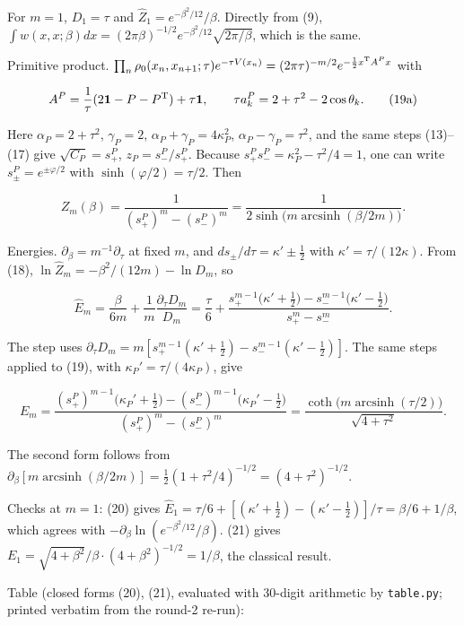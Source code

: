 \documentclass[11pt,a4paper]{article}
\newcommand{\tagmark}[1]{\marginnote{\scriptsize\ttfamily #1}}
\newcommand{\Dtag}{\tagmark{[D]}}   %
\newcommand{\passthrough}[1]{#1}
\begin{document}
For \(m=1\), \(D_1 = \tau\) and \(\hat Z_1 = e^{-\beta^2/12}/\beta\).
Directly from (9),
\(\int w(x,x;\beta)dx = (2\pi\beta)^{-1/2}e^{-\beta^2/12}\sqrt{2\pi/\beta}\),
which is the same.

Primitive product.
\(\prod_n\rho_0(x_n,x_{n+1};\tau)e^{-\tau V(x_n)} = (2\pi\tau)^{-m/2}e^{-\frac12x^{\rm T}A^Px}\)
with

\[
A^P = \frac1\tau(2\mathbf 1 - P - P^{\rm T}) + \tau\mathbf 1,\qquad \tau a^P_k = 2 + \tau^2 - 2\cos\theta_k. \tag{19a}
\]

\Dtag{} Here \(\alpha_P = 2+\tau^2\), \(\gamma_P = 2\),
\(\alpha_P+\gamma_P = 4\kappa_P^2\), \(\alpha_P - \gamma_P = \tau^2\),
and the same steps (13)--(17) give \(\sqrt{C_P} = s^P_+\),
\(z_P = s^P_-/s^P_+\). Because
\(s^P_+s^P_- = \kappa_P^2 - \tau^2/4 = 1\), one can write
\(s^P_\pm = e^{\pm\varphi/2}\) with \(\sinh(\varphi/2) = \tau/2\). Then

\[
\boxed{\,Z_m(\beta) = \frac{1}{(s^P_+)^m - (s^P_-)^m} = \frac{1}{2\sinh\big(m\operatorname{arcsinh}(\beta/2m)\big)}.\,} \tag{19}
\]

Energies. \(\partial_\beta = m^{-1}\partial_\tau\) at fixed \(m\), and
\(ds_\pm/d\tau = \kappa'\pm\tfrac12\) with
\(\kappa' = \tau/(12\kappa)\). From (18),
\(\ln\hat Z_m = -\beta^2/(12m) - \ln D_m\), so

\[
\hat E_m = \frac{\beta}{6m} + \frac1m\frac{\partial_\tau D_m}{D_m} = \frac\tau6 + \frac{s_+^{m-1}\big(\kappa' + \frac12\big) - s_-^{m-1}\big(\kappa'-\frac12\big)}{s_+^m - s_-^m}. \tag{20}
\]

\Dtag{} The step uses
\(\partial_\tau D_m = m[s_+^{m-1}(\kappa'+\tfrac12) - s_-^{m-1}(\kappa'-\tfrac12)]\).
The same steps applied to (19), with \(\kappa_P' = \tau/(4\kappa_P)\),
give

\[
E_m = \frac{(s^P_+)^{m-1}\big(\kappa_P'+\frac12\big) - (s^P_-)^{m-1}\big(\kappa_P'-\frac12\big)}{(s^P_+)^m - (s^P_-)^m} = \frac{\coth\big(m\operatorname{arcsinh}(\tau/2)\big)}{\sqrt{4+\tau^2}}. \tag{21}
\]

\Dtag{} The second form follows from
\(\partial_\beta[m\operatorname{arcsinh}(\beta/2m)] = \tfrac12(1+\tau^2/4)^{-1/2} = (4+\tau^2)^{-1/2}\).

Checks at \(m=1\): (20) gives
\(\hat E_1 = \tau/6 + [(\kappa'+\tfrac12) - (\kappa'-\tfrac12)]/\tau = \beta/6 + 1/\beta\),
which agrees with \(-\partial_\beta\ln(e^{-\beta^2/12}/\beta)\). (21)
gives \(E_1 = \sqrt{4+\beta^2}/\beta\cdot(4+\beta^2)^{-1/2} = 1/\beta\),
the classical result.

Table (closed forms (20), (21), evaluated with 30-digit arithmetic by
\passthrough{\lstinline!table.py!}; printed verbatim from the round-2
re-run):
\end{document}
